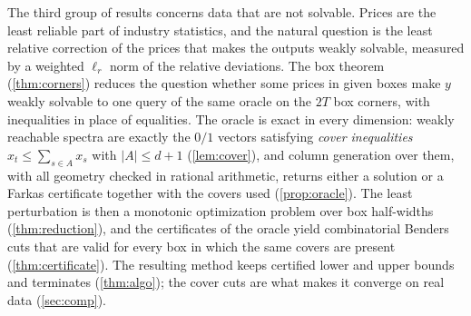The third group of results concerns data that are not solvable. Prices are the least reliable part of industry statistics, and the natural question is the least relative correction of the prices that makes the outputs weakly solvable, measured by a weighted $\ell_r$ norm of the relative deviations. The box theorem (\cref{thm:corners}) reduces the question whether some prices in given boxes make $y$ weakly solvable to one query of the same oracle on the $2T$ box corners, with inequalities in place of equalities. The oracle is exact in every dimension: weakly reachable spectra are exactly the $0/1$ vectors satisfying \emph{cover inequalities} $x_t\le\sum_{s\in A}x_s$ with $|A|\le d+1$ (\cref{lem:cover}), and column generation over them, with all geometry checked in rational arithmetic, returns either a solution or a Farkas certificate together with the covers used (\cref{prop:oracle}). The least perturbation is then a monotonic optimization problem over box half-widths (\cref{thm:reduction}), and the certificates of the oracle yield combinatorial Benders cuts that are valid for every box in which the same covers are present (\cref{thm:certificate}). The resulting method keeps certified lower and upper bounds and terminates (\cref{thm:algo}); the cover cuts are what makes it converge on real data (\cref{sec:comp}).

